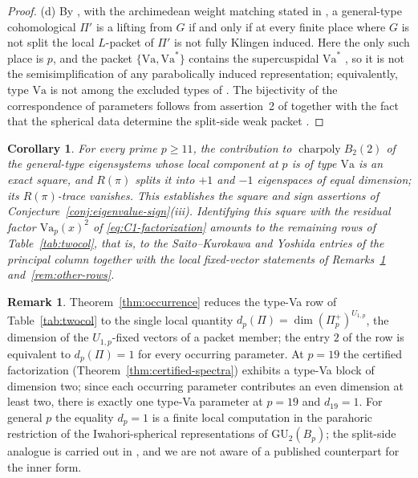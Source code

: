 \documentclass[11pt]{amsart}
\theoremstyle{plain}
\newtheorem{corollary}[theorem]{Corollary}
\theoremstyle{definition}
\newtheorem{remark}[theorem]{Remark}
\newcommand{\GU}{\mathrm{GU}}
\newcommand{\Va}{\mathrm{Va}}
\DeclareMathOperator{\charp}{charpoly}
\providecommand{\Va}{\mathrm{Va}}
\providecommand{\charp}{\operatorname{charpoly}}
\begin{document}
\begin{proof}
		\textup{(d)} By \cite[Thm.~11.4(4)]{RoesnerWeissauer2021}, with the
		archimedean weight matching stated in
		\cite[Cor.~11.7]{RoesnerWeissauer2021}, a general-type cohomological
		$\Pi'$ is a lifting from $G$ if and only if at every finite place
		where $G$ is not split the local $L$-packet of $\Pi'$ is not fully
		Klingen induced. Here the only such place is $p$, and the packet
		$\{\Va,\Va^{*}\}$ contains the supercuspidal $\Va^{*}$
		\cite[\S3]{Schmidt2018}, so it is not the semisimplification of any
		parabolically induced representation; equivalently, type $\Va$ is
		not among the excluded types of
		\cite[Cor.~11.7]{RoesnerWeissauer2021}. The bijectivity of the
		correspondence of parameters follows from assertion~2 of
		\cite[Thm.~11.4]{RoesnerWeissauer2021} together with the fact that
		the spherical data determine the split-side weak packet
		\cite[Prop.~10.1(6)]{RoesnerWeissauer2021}.
	\end{proof}
	
	\begin{corollary}
		\label{cor:conj-iii}
		For every prime $p\ge11$, the contribution to $\charp B_2(2)$ of
		the general-type eigensystems whose local component at $p$ is of
		type $\Va$ is an exact square, and $R(\pi)$ splits it into $+1$ and
		$-1$ eigenspaces of equal dimension; its $R(\pi)$-trace vanishes.
		This establishes the square and sign assertions of
		Conjecture~\ref{conj:eigenvalue-sign}\textup{(iii)}. Identifying
		this square with the residual factor $\Va_p(x)^2$ of
		\eqref{eq:C1-factorization} amounts to the remaining rows of
		Table~\ref{tab:twocol}, that is, to the Saito--Kurokawa and Yoshida
		entries of the principal column together with the local
		fixed-vector statements of Remarks~\ref{rem:local-constant}
		and~\ref{rem:other-rows}.
	\end{corollary}
	
	\begin{remark}\label{rem:local-constant}
		Theorem~\ref{thm:occurrence} reduces the type-Va row of
		Table~\ref{tab:twocol} to the single local quantity
		$d_p(\Pi)=\dim(\Pi_p^+)^{U_{1,p}}$, the dimension of the
		$U_{1,p}$-fixed vectors of a packet member; the entry $2$ of the
		row is equivalent to $d_p(\Pi)=1$ for every occurring parameter. At
		$p=19$ the certified factorization
		(Theorem~\ref{thm:certified-spectra}) exhibits a type-Va block of
		dimension two; since each occurring parameter contributes an even
		dimension at least two, there is exactly one type-Va parameter at
		$p=19$ and $d_{19}=1$. For general $p$ the equality $d_p=1$ is a
		finite local computation in the parahoric restriction of the
		Iwahori-spherical representations of $\GU_2(B_p)$; the split-side
		analogue is carried out in \cite{Roesner2016}, and we are not aware
		of a published counterpart for the inner form.
	\end{remark}
	
\end{document}
